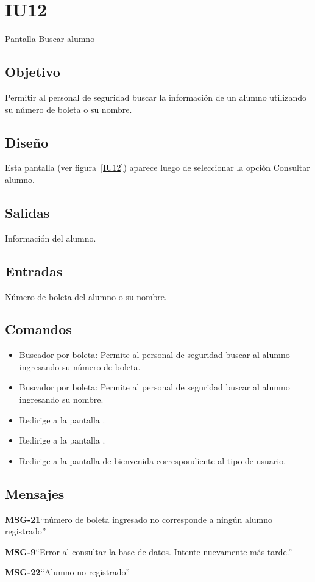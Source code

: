 \section{IU12} {Pantalla Buscar alumno}

\subsection{Objetivo}
    Permitir al personal de seguridad buscar la información de un alumno utilizando su número de boleta o su nombre. 

\subsection{Diseño}
    Esta pantalla  (ver figura~\ref{IU12}) aparece luego de seleccionar la opción Consultar alumno. 


\subsection{Salidas}
    Información del alumno.

\subsection{Entradas}
    Número de boleta del alumno o su nombre. 

\subsection{Comandos}
\begin{itemize}
    \item Buscador por boleta: Permite al personal de seguridad buscar al alumno ingresando su número de boleta.
    \item Buscador por boleta: Permite al personal de seguridad buscar al alumno ingresando su nombre.
    \item {} Redirige a la pantalla .
    \item {} Redirige a la pantalla .
    \item {} Redirige a la pantalla de bienvenida correspondiente al tipo de usuario.
\end{itemize}

\subsection{Mensajes}

\begin{Citemize}
    \item {\bf MSG-21}{``número de boleta ingresado no corresponde a ningún alumno registrado''}
    \item {\bf MSG-9}{``Error al consultar la base de datos. Intente nuevamente más tarde.''}
    \item {\bf MSG-22}{``Alumno no registrado''}
\end{Citemize}


